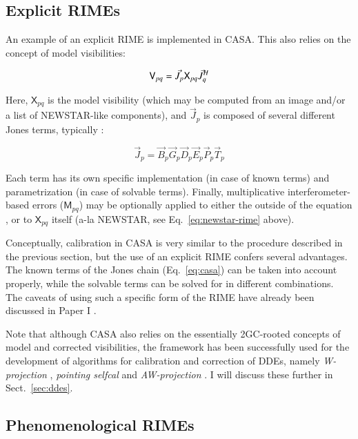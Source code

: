 \documentclass{aa}
\newcommand{\herm}{H}
\newcommand{\jones}[2]{\vec {#1}_{#2}}
\newcommand{\jonesT}[2]{\vec {#1}^{\herm}_{#2}}
\newcommand{\coh}[2]{\mathsf{{#1}}_{{#2}}}
\begin{document}
\subsection{Explicit RIMEs}

An example of an explicit RIME is implemented in CASA. This also relies on the concept of model visibilities:

\begin{equation}\label{eq:casa-rime}
\coh{V}{pq}  =  \jones{J}{p} \coh{X}{pq} \jonesT{J}{q} \\
\end{equation}

Here, $\coh{X}{pq}$ is the model visibility (which may be computed from an image and/or
a list of NEWSTAR-like components), and $\jones{J}{p}$ is composed of several different Jones terms, typically \citep[Appendix E.1]{CASA:UserRef}:

\begin{equation}\label{eq:casa}
\jones{J}{p} = \jones{B}{p} \jones{G}{p} \jones{D}{p} \jones{E}{p} \jones{P}{p} \vec  T_p
\end{equation}

Each term has its own specific implementation (in case of known terms) and parametrization (in case of solvable terms). Finally, multiplicative interferometer-based errors ($\coh{M}{pq}$) may be optionally applied to either the outside of the equation \citep[as per Eq.~24 of Paper I,][]{RRIME1}, or to $\coh{X}{pq}$ itself (a-la NEWSTAR, see Eq.~\ref{eq:newstar-rime} above). 

Conceptually, calibration in CASA is very similar to the procedure described in the previous section, but the use of an explicit RIME confers several advantages. The known terms of the Jones chain (Eq.~\ref{eq:casa}) can be taken into account properly, while the solvable terms can be solved for in different combinations. The caveats of using such a specific form of the RIME have already been discussed in Paper I \citep[Sect.~6.2]{RRIME1}.

Note that although CASA also relies on the essentially 2GC-rooted concepts of model and corrected visibilities, the framework has been successfully used for the development of algorithms for calibration and correction of DDEs, namely \emph{W-projection} \citep{Cornwell:wproj}, \emph{pointing selfcal} \citep{SB:pointing} and \emph{AW-projection} \citep{SB:imageplane}. I will discuss these further in Sect.~\ref{sec:ddes}.

\subsection{\label{sec:phenomenological}Phenomenological RIMEs}
\end{document}
